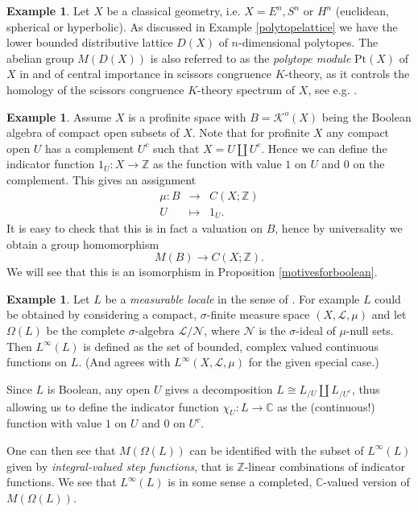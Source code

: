\documentclass[10pt]{amsart}
\theoremstyle{definition}
\newtheorem{example}[theorem]{Example}
\begin{document}
\begin{example}
Let $X$ be a classical geometry, i.e. $X = E^n, S^n$ or $H^n$ (euclidean, spherical or hyperbolic). As discussed in Example \ref{polytopelattice} we have the lower bounded distributive lattice $D(X)$ of $n$-dimensional polytopes. The abelian group
$M(D(X))$ is also referred to as the \emph{polytope module} $\mathrm{Pt}(X)$ of $X$ in \cite{malkiewich2024higherscissorscongruence} and of central importance in scissors congruence $K$-theory, as it controls the homology of the scissors congruence $K$-theory spectrum of $X$, see e.g. \cite[Theorem 1.5]{malkiewich2024higherscissorscongruence}.
\end{example}

\begin{example}
Assume $X$ is a profinite space with $B =  \mathcal{K}^o(X)$ being the Boolean algebra of compact open subsets of $X$. Note that for profinite $X$ any compact open $U$ has a complement $U^c$ such that $X = U \amalg U^c$. Hence we can define the indicator function $1_U : X \rightarrow \mathbb{Z}$ as the function with value $1$ on $U$ and $0$ on the complement. This gives an assignment
$$\begin{array}{rcl}
\mu : B & \rightarrow & C(X; \mathbb{Z}) \\
U & \mapsto & 1_U.
\end{array}$$
It is easy to check that this is in fact a valuation on $B$, hence by universality we obtain a group homomorphism
$$M(B) \rightarrow C(X; \mathbb{Z}).$$
We will see that this is an isomorphism in Proposition \ref{motivesforboolean}.
\end{example}

\begin{example} \label{measurespacemotive} Let $L$ be a \emph{measurable locale} in the sense of \cite{Pavlov_2022}. For example $L$ could be obtained by considering a compact, $\sigma$-finite measure space $(X, \mathcal{L}, \mu)$ and let $\Omega(L)$ be the complete $\sigma$-algebra $\mathcal{L}/\mathcal{N}$, where $\mathcal{N}$ is the $\sigma$-ideal of $\mu$-null sets. Then $L^\infty(L)$ is defined as the set of bounded, complex valued continuous functions on $L$. (And agrees with $L^\infty(X, \mathcal{L}, \mu)$ for the given special case.)

Since $L$ is Boolean, any open $U$ gives a decomposition $L \cong L_{/U} \amalg L_{/U^{c}}$, thus allowing us to define the indicator function $\chi_U : L \rightarrow \mathbb{C}$ as the (continuous!) function with value $1$ on $U$ and $0$ on $U^c$.

One can then see that $M(\Omega(L))$ can be identified with the subset of $L^\infty(L)$ given by \emph{integral-valued step functions}, that is $\mathbb{Z}$-linear combinations of indicator functions. We see that $L^\infty(L)$ is in some sense a completed, $\mathbb{C}$-valued version of $M(\Omega(L))$.
\end{example}
\end{document}
